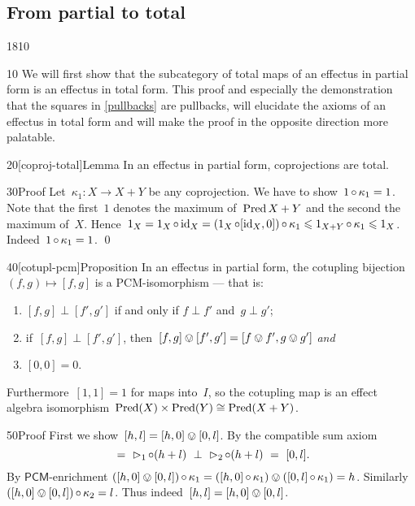 \subsection{From partial to total}
\begin{parsec}{1810}%
\begin{point}{10}%
We will first show that the subcategory of
    total maps of an effectus in partial form
    is an effectus in total form.
This proof and especially the demonstration
    that the squares in \eqref{pullbacks} are pullbacks,
    will elucidate the axioms of an effectus in total form
    and will make the proof in the opposite direction more palatable.
\end{point}
\begin{point}{20}[coproj-total]{Lemma}%
In an effectus in partial form,
    coprojections are total.
\begin{point}{30}{Proof}%
Let~$\kappa_1 \colon X \to X+Y$ be any coprojection.
We have to show~$1 \mathop{\circ} \kappa_1 = 1$.
Note that the first~$1$ denotes the maximum of~$\operatorname{Pred} X+Y$
    and the second the maximum of~$X$.
    Hence~$1_X = 1_X \mathop{\circ} \operatorname{id}_X = (1_X \mathop{\circ} [\operatorname{id}_X, 0]) \mathop{\circ} \kappa_1
                    \leqslant 1_{X+Y} \mathop{\circ} \kappa_1 \leqslant 1_X$.
Indeed~$1 \mathop{\circ} \kappa_1 = 1$. \qed
\end{point}
\end{point}
\begin{point}{40}[cotupl-pcm]{Proposition}%
In an effectus in partial form,
the cotupling bijection~$(f,g) \mapsto [f,g]$
    is a PCM-isomorphism ---
    that is:
\begin{enumerate}
\item
    $[f,g] \perp [f',g']$ if and only if
        $f \perp f'$ and~$g \perp g'$;
\item
    if~$[f,g] \perp [f', g']$,
    then~$[f,g] \ovee [f',g'] = [f \ovee f', g\ovee g']$ \emph{and}
\item
    $[0,0] = 0$.
\end{enumerate}
Furthermore~$[1,1]=1$ for maps into~$I$,
so the cotupling map is an effect algebra
isomorphism~$\operatorname{Pred} (X) \times \operatorname{Pred} (Y) \cong \operatorname{Pred} (X+Y) $.
\begin{point}{50}{Proof}%
First we show~$[h,l] = [h,0] \ovee [0,l]$.
By the compatible sum axiom
\begin{equation*}
    [h, 0] \ = \ 
    \pproj_1 \after (h + l)
    \ \perp\  \pproj_2 \after (h + l)
    \ = \ [0, l].
\end{equation*}
By $\mathsf{PCM}$-enrichment
$([h, 0] \ovee [0, l]) \mathop{\circ} \kappa_1
         =  ([h, 0] \mathop{\circ} \kappa_1) \ovee
        ([0, l] \mathop{\circ} \kappa_1)  = h$.
Similarly~$([h, 0] \ovee [0, l]) \mathop{\circ} \kappa_2 = l$.
Thus indeed~$[h,l] = [h,0] \ovee [0,l]$.


\end{point}
\end{point}
\end{parsec}
